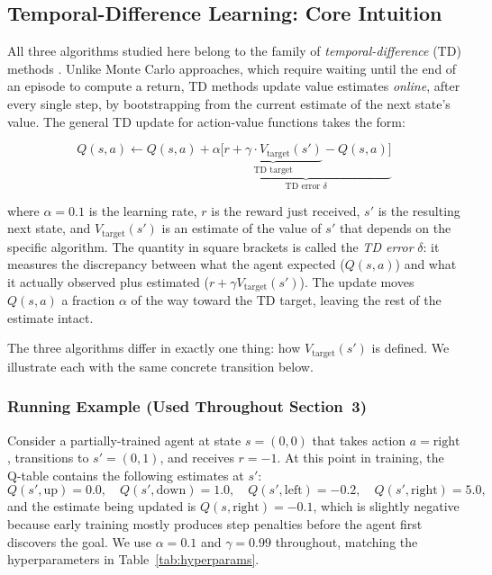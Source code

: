 \documentclass[11pt]{article}
\begin{document}
\subsection{Temporal-Difference Learning: Core Intuition}

All three algorithms studied here belong to the family of
\emph{temporal-difference} (TD) methods \cite{sutton1988}. Unlike
Monte Carlo approaches, which require waiting until the end of an episode
to compute a return, TD methods update value estimates \emph{online},
after every single step, by bootstrapping from the current estimate of the
next state's value. The general TD update for action-value functions takes
the form:

\[
    Q(s, a) \leftarrow Q(s, a) +
    \alpha \underbrace{\Big[
        \underbrace{r + \gamma \cdot V_{\text{target}}(s')}_{{\text{TD target}}}
        - Q(s, a)
    \Big]}_{\text{TD error } \delta}
\]

where $\alpha = 0.1$ is the learning rate, $r$ is the reward just
received, $s'$ is the resulting next state, and $V_{\text{target}}(s')$
is an estimate of the value of $s'$ that depends on the specific
algorithm. The quantity in square brackets is called the \emph{TD error}
$\delta$: it measures the discrepancy between what the agent expected
($Q(s,a)$) and what it actually observed plus estimated ($r + \gamma
V_{\text{target}}(s')$). The update moves $Q(s,a)$ a fraction $\alpha$
of the way toward the TD target, leaving the rest of the estimate intact.

The three algorithms differ in exactly one thing: how $V_{\text{target}}(s')$
is defined. We illustrate each with the same concrete transition below.

\subsubsection*{Running Example (Used Throughout Section~3)}

Consider a partially-trained agent at state $s = (0,0)$ that takes action
$a = \text{right}$, transitions to $s' = (0,1)$, and receives $r = -1$.
At this point in training, the Q-table contains the following estimates at $s'$:
\[
    Q(s', \text{up}) = 0.0, \quad
    Q(s', \text{down}) = 1.0, \quad
    Q(s', \text{left}) = -0.2, \quad
    Q(s', \text{right}) = 5.0,
\]
and the estimate being updated is $Q(s, \text{right}) = -0.1$, which
is slightly negative because early training mostly produces step
penalties before the agent first discovers the goal. We use
$\alpha = 0.1$ and $\gamma = 0.99$ throughout, matching the
hyperparameters in Table~\ref{tab:hyperparams}.
\end{document}
